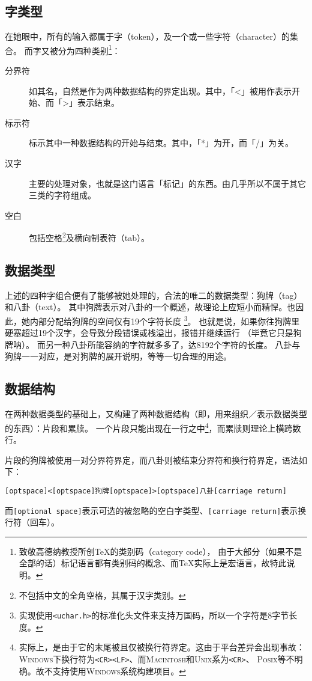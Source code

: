 \documentclass[twoside]{ltjsarticle}
\begin{document}
\subsection{字类型}
在她眼中，所有的输入都属于字（token），及一个或一些字符（character）的集合。
而字又被分为四种类别\footnote{致敬高德纳教授所创{\TeX}的类别码（category code），
由于大部分（如果不是全部的话）标记语言都有类别码的概念、而{\TeX}实际上是宏语言，故特此说明。}：
\begin{description}
  \item[分界符] 如其名，自然是作为两种数据结构的界定出现。其中，「<」被用作表示开始、而「>」表示结束。
  \item[标示符] 标示其中一种数据结构的开始与结束。其中，「*」为开，而「/」为关。
  \item[汉字] 主要的处理对象，也就是这门语言「标记」的东西。由几乎所以不属于其它三类的字符组成。
  \item[空白] 包括空格\footnote{不包括中文的全角空格，其属于汉字类别。}及横向制表符（tab）。
\end{description}\par
\subsection{数据类型}
上述的四种字组合便有了能够被她处理的，合法的唯二的数据类型：狗牌（tag）和八卦（text）。
其中狗牌表示对八卦的一个概述，故理论上应短小而精悍。也因此，她内部分配给狗牌的空间仅有19个字符长度
\footnote{实现使用\lstinline|<uchar.h>|的标准化头文件来支持万国码，所以一个字符是8字节长度。}。
也就是说，如果你往狗牌里硬塞超过19个汉字，会导致分段错误或栈溢出，报错并继续运行
（毕竟它只是狗牌呐）。
而另一种八卦所能容纳的字符就多多了，达8192个字符的长度。
八卦与狗牌一一对应，是对狗牌的展开说明，等等一切合理的用途。
\subsection{数据结构}
在两种数据类型的基础上，又构建了两种数据结构（即，用来组织／表示数据类型的东西）：片段和累牍。
一个片段只能出现在一行之中\footnote{实际上，是由于它的末尾被且仅被换行符界定。这由于平台差异会出现事故：
{\scshape Windows}下换行符为\lstinline|<CR><LF>|、而{\scshape Macintosh}和{\scshape Unix}系为\lstinline|<CR>|、
{\scshape Posix}等不明确。故不支持使用{\scshape Windows}系统构建项目。}，而累牍则理论上横跨数行。\par
片段的狗牌被使用一对分界符界定，而八卦则被结束分界符和换行符界定，语法如下：
\begin{lstlisting}
[optspace]<[optspace]狗牌[optspace]>[optspace]八卦[carriage return]
\end{lstlisting}
而\lstinline|[optional space]|表示可选的被忽略的空白字类型、\lstinline|[carriage return]|表示换行符（回车）。
\end{document}
